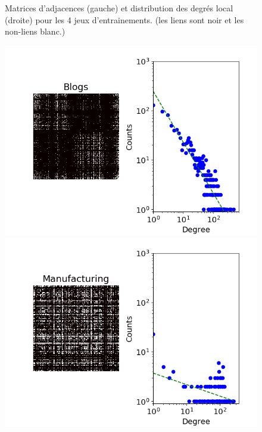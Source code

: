\documentclass[french]{hermes-journal}
\begin{document}
\begin{figure}[h] {Matrices d'adjacences (gauche) et distribution des degrés local (droite) pour les 4 jeux d'entrainements. (les liens sont noir et les non-liens blanc.)}
\begin{minipage}{0.4\textwidth}
            \includegraphics[width=1.1\textwidth]{img/corpus/blogs_dd}
        \end{minipage}
        \begin{minipage}{0.4\textwidth}
            \includegraphics[width=1.1\textwidth]{img/corpus/manufacturing_dd}
        \end{minipage}
	\label{fig:corpuses}
\end{figure}
\end{document}
